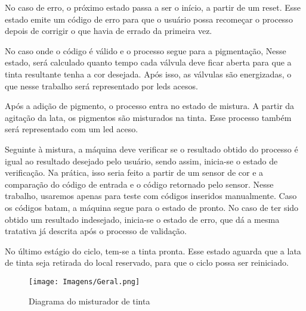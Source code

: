 \documentclass[12pt,a4paper,oneside]{abntex2}
\begin{document}
            No caso de erro, o próximo estado passa a ser o início, a partir de um reset. Esse estado emite um código de erro para que o usuário possa recomeçar o processo depois de corrigir o que havia de errado da primeira vez.\par
            No caso onde o código é válido e o processo segue para a pigmentação, Nesse estado, será calculado quanto tempo cada válvula deve ficar aberta para que a tinta resultante tenha a cor desejada. Após isso, as válvulas são energizadas, o que nesse trabalho será representado por leds acesos.\par
            Após a adição de pigmento, o processo entra no estado de mistura. A partir da agitação da lata, os pigmentos são misturados na tinta. Esse processo também será representado com um led aceso.\par
            Seguinte à mistura, a máquina deve verificar se o resultado obtido do processo é igual ao resultado desejado pelo usuário, sendo assim, inicia-se o estado de verificação. Na prática, isso seria feito a partir de um sensor de cor e a comparação do código de entrada e o código retornado pelo sensor. Nesse trabalho, usaremos apenas para teste com códigos inseridos manualmente. Caso os códigos batam, a máquina segue para o estado de pronto. No caso de ter sido obtido um resultado indesejado, inicia-se o estado de erro, que dá a mesma tratativa já descrita após o processo de validação.\par
            No último estágio do ciclo, tem-se a tinta pronta. Esse estado aguarda que a lata de tinta seja retirada do local reservado, para que o ciclo possa ser reiniciado.\par
            \begin{figure}[h]
                \centering
                \texttt{[image: Imagens/Geral.png]}
                \caption{Diagrama do misturador de tinta}
                \label{fig:geral}
            \end{figure}

        
\end{document}
